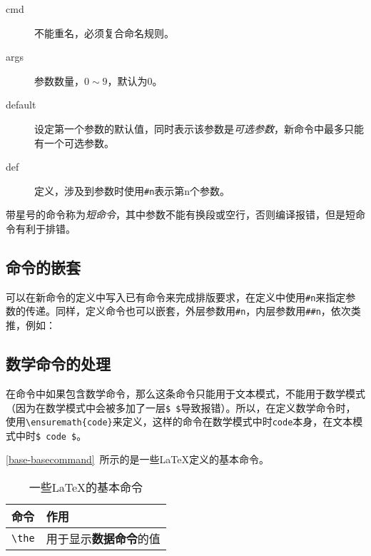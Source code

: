 \begin{description}
    \item[cmd] 不能重名，必须复合命名规则。
    \item[args] 参数数量，$ 0\sim9 $，默认为$ 0 $。
    \item[default] 设定第一个参数的默认值，同时表示该参数是\textit{可选参数}，新命令中最多只能有一个可选参数。
    \item[def] 定义，涉及到参数时使用\lstinline|#n|表示第n个参数。
\end{description}

带星号的命令称为\textit{短命令}，其中参数不能有换段或空行，否则编译报错，但是短命令有利于排错。

\begin{latex}
\newcommand{cmd}[args][default]{def}
\newcommand*{cmd}[args][default]{def}
\renewcommand{cmd}[args][default]{def}
\renewcommand*{cmd}[args][default]{def}
\end{latex}

\subsection{命令的嵌套}
可以在新命令的定义中写入已有命令来完成排版要求，在定义中使用\lstinline|#n|来指定参数的传递。同样，定义命令也可以嵌套，外层参数用\lstinline|#n|，内层参数用\lstinline|##n|，依次类推，例如：

\begin{latex}
\newcommand{\A}{\renewcommand{\B}{def}}
\end{latex}

\subsection{数学命令的处理}
在命令中如果包含数学命令，那么这条命令只能用于文本模式，不能用于数学模式（因为在数学模式中会被多加了一层\lstinline|$ $|导致报错）。所以，在定义数学命令时，使用\lstinline|\ensuremath{code}|来定义，这样的命令在数学模式中时\lstinline|code|本身，在文本模式中时\lstinline|$ code $|。

\autoref{base-basecommand}~所示的是一些\LaTeX{}定义的基本命令。

\begin{table}[h]
    \centering
    \caption{一些\LaTeX{}的基本命令}
    \label{base-basecommand}
    \begin{tabular}{ll}
        \toprule
        命令 & 作用\\
        \midrule
        \verb|\the| & 用于显示\textbf{数据命令}的值\\
        \bottomrule
    \end{tabular}
\end{table}

